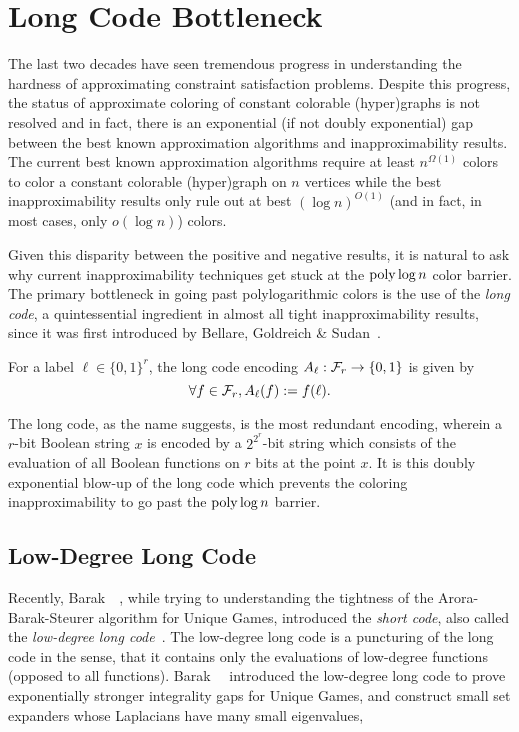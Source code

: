 

\chapter{Long Code Bottleneck}


The last two decades have seen tremendous progress in understanding
the hardness of approximating constraint satisfaction
problems. Despite this progress, the status of approximate coloring of
constant colorable (hyper)graphs is not resolved and in fact, there is
an exponential (if not doubly exponential) gap between the best known
approximation algorithms and inapproximability results. The current
best known approximation algorithms require at least $n^{\Omega(1)}$
colors to color a constant colorable (hyper)graph on $n$ vertices
while the best inapproximability results only rule out at best $(\log
n)^{O(1)}$ (and in fact, in most cases, only $o(\log n)$) colors.

Given this disparity between the positive and negative results, it is
natural to ask why current inapproximability techniques get stuck at
the $\textnormal{poly}\log n$ color barrier. The primary bottleneck in going past
polylogarithmic colors is the use of the {\em long code}, a
quintessential ingredient in almost all tight inapproximability results,
since it was first introduced by Bellare, Goldreich \&
Sudan~\cite{BellareGS1998}. 

\begin{definition}
For a label $\ell \in \{0,1\}^r$, the long code encoding $A_\ell: \mathcal{F}_r \rightarrow \{0,1\}$
is given by
$$\forall f \in \mathcal{F}_r, A_\ell(f) := f(\ell).$$
\end{definition}
The long code, as the name suggests, is
the most redundant encoding, wherein a $r$-bit Boolean string $x$ is
encoded by a $2^{2^r}$-bit string which consists of the evaluation of
all Boolean functions on $r$ bits at the point $x$.
It is this doubly
exponential blow-up of the long code which prevents the coloring
inapproximability to go past the $\textnormal{poly} \log n$ barrier.
 
\section{Low-Degree Long Code}
\label{sec:low-deg-long-code}
Recently,
Barak~\etal~\cite{BarakGHMRS2012}, while trying to understanding the
tightness of the Arora-Barak-Steurer algorithm for Unique Games,
introduced the {\em short code}, also called the {\em low-degree long
  code}~\cite{DinurG2013}. The low-degree long code is a puncturing of
the long code in the sense, that it contains only the evaluations of
low-degree functions (opposed to all
functions). Barak~\etal~\cite{BarakGHMRS2012} introduced the
low-degree long code to prove exponentially stronger integrality gaps
for Unique Games, and construct small set expanders whose Laplacians
have many small eigenvalues,

